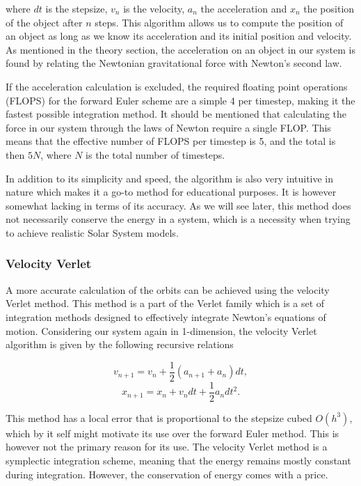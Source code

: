 \documentclass[a4paper, 10pt, reqno]{amsart}
\begin{document}
\noindent where $dt$ is the stepsize, $v_n$ is the velocity, $a_n$ the acceleration and $x_n$ the position of the object after $n$ steps. This algorithm allows us to compute the position of an object as long as we know its acceleration and its initial position and velocity. As mentioned in the theory section, the acceleration on an object in our system is found by relating the Newtonian gravitational force with Newton's second law.

If the acceleration calculation is excluded, the required floating point operations (FLOPS) for the forward Euler scheme are a simple 4 per timestep, making it the fastest possible integration method. It should be mentioned that calculating the force in our system through the laws of Newton require a single FLOP. This means that the effective number of FLOPS per timestep is 5, and the total is then $5N$, where $N$ is the total number of timesteps. 

In addition to its simplicity and speed, the algorithm is also very intuitive in nature which makes it a go-to method for educational purposes.
It is however somewhat lacking in terms of its accuracy. As we will see later, this method does not necessarily conserve the energy in a system, which is a necessity when trying to achieve realistic Solar System models.

\subsubsection{Velocity Verlet} A more accurate calculation of 
the orbits can be achieved using the velocity Verlet method. This method is a part of the Verlet family which is a set of integration methods designed to effectively integrate Newton's equations of motion. Considering our system again in 1-dimension, the velocity Verlet algorithm is given by the following recursive relations

\begin{equation}\label{eq:17}
    v_{n+1} = v_n + \frac{1}{2}( a_{n+1} + a_n) dt,
\end{equation}
\begin{equation}\label{eq:18}
    x_{n+1} = x_n + v_n dt + \frac{1}{2}a_n dt^2.
\end{equation}

\noindent This method has a local error that is proportional to the stepsize cubed $O(h^3)$, which by it self might motivate its use over the forward Euler method. This is however not the primary reason for its use. The velocity Verlet method is a symplectic integration scheme, meaning that the energy remains mostly constant during integration. However, the conservation of energy comes with a price. 
\end{document}
